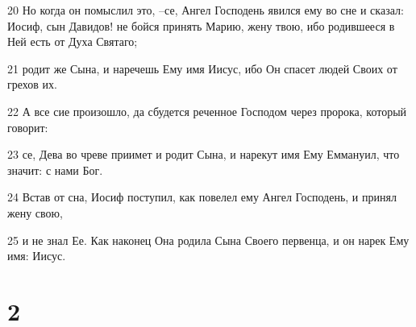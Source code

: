 \par 20 Но когда он помыслил это, --се, Ангел Господень явился ему во сне и сказал: Иосиф, сын Давидов! не бойся принять Марию, жену твою, ибо родившееся в Ней есть от Духа Святаго;
\par 21 родит же Сына, и наречешь Ему имя Иисус, ибо Он спасет людей Своих от грехов их.
\par 22 А все сие произошло, да сбудется реченное Господом через пророка, который говорит:
\par 23 се, Дева во чреве приимет и родит Сына, и нарекут имя Ему Еммануил, что значит: с нами Бог.
\par 24 Встав от сна, Иосиф поступил, как повелел ему Ангел Господень, и принял жену свою,
\par 25 и не знал Ее. Как наконец Она родила Сына Своего первенца, и он нарек Ему имя: Иисус.

\chapter{2}

